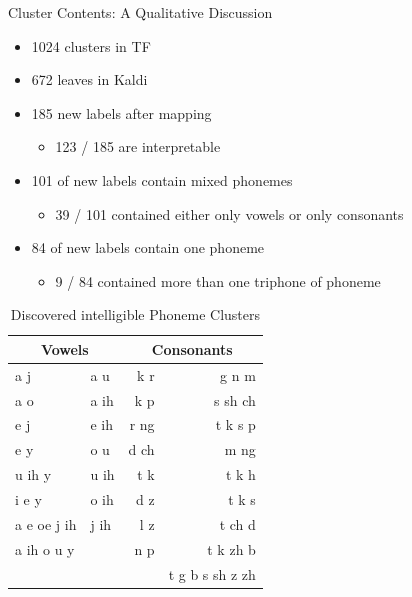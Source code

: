 \documentclass[final]{beamer} %
\begin{document}
\begin{frame}
\begin{columns}
\begin{column}{0.3\textwidth}
{        
        \begin{block}{\boxnumber Cluster Contents: A Qualitative Discussion}
          
          \begin{itemize}
          \item 1024 clusters in TF
          \item 672 leaves in Kaldi
            
          \item 185 new labels after mapping
            \begin{itemize}
            \item 123 / 185 are interpretable
            \end{itemize}
          \item 101 of new labels contain mixed phonemes
            \begin{itemize}
            \item 39 / 101 contained either only vowels or only consonants
            \end{itemize}
          \item 84 of new labels contain one phoneme
            \begin{itemize}
            \item 9 / 84 contained more than one triphone of phoneme
            \end{itemize}
          \end{itemize}
          
          \begin{table}[!htbp]
            \centering
            \caption{Discovered intelligible Phoneme Clusters}
            \label{tab:results}
            \begin{adjustbox}{width=.5\textwidth}
              \begin{tabular}{llrr}
                \toprule
                \multicolumn{2}{c}{Vowels} &  \multicolumn{2}{c}{ Consonants} \\
                \midrule
                a  j & a  u  &   k  r &     g n m \\
                a  o & a  ih  &    k p  &    s sh ch\\
                e  j & e  ih & r ng & t k s p \\
                e  y &o  u & d ch & m ng\\
                u  ih  y   & u  ih & t k & t k h\\
                i  e  y &o  ih & d z&t k s \\
                a  e  oe  j ih & j ih & l z  & t ch d\\
                a  ih  o  u  y &  &  n p & t k zh b  \\
                &&& t g b s sh z zh \\
                \bottomrule
              \end{tabular}
            \end{adjustbox}
          \end{table}
          

\end{block}}
\end{column}
\end{columns}
\end{frame}
\end{document}
